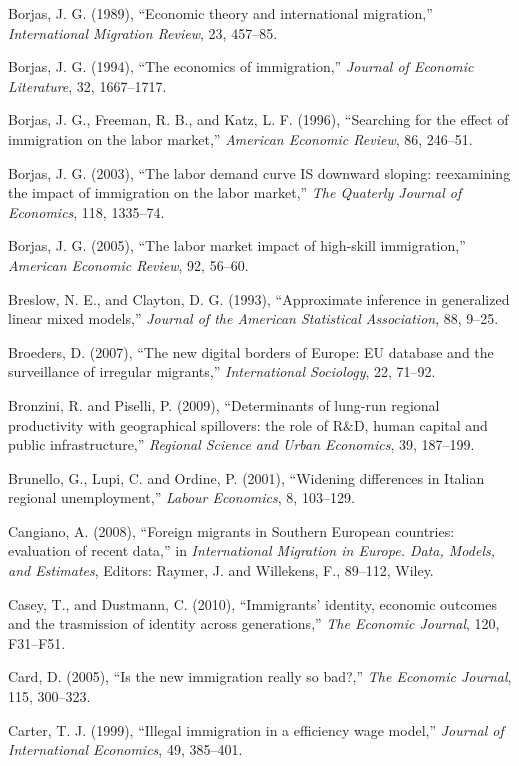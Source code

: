 \documentclass[10pt]{article}
\theoremstyle{definition}
\theoremstyle{plain}
\begin{document}
\begin{thebibliography}{99}
\bibitem{} Borjas, J. G. (1989), ``Economic theory and international migration,'' \textit{International Migration Review}, 23, 457--85.

\bibitem{} Borjas, J. G. (1994), ``The economics of immigration,'' \textit{Journal of Economic Literature}, 32, 1667--1717.

\bibitem{} Borjas, J. G., Freeman, R. B., and Katz, L. F. (1996), ``Searching for the effect of immigration on the labor market,'' \textit{American Economic Review}, 86, 246--51.

\bibitem{} Borjas, J. G. (2003), ``The labor demand curve IS downward sloping: reexamining the impact of immigration on the labor market,'' \textit{The Quaterly Journal of Economics}, 118, 1335--74.

\bibitem{} Borjas, J. G. (2005), ``The labor market impact of high-skill immigration,'' \textit{American Economic Review}, 92, 56--60.

\bibitem{} Breslow, N. E., and Clayton, D. G. (1993), ``Approximate inference in generalized linear mixed models,'' \textit{Journal of the American Statistical Association}, 88, 9--25.

\bibitem{} Broeders, D. (2007), ``The new digital borders of Europe: EU database and the surveillance of irregular migrants,'' \textit{International Sociology}, 22, 71--92.

\bibitem{} Bronzini, R. and Piselli, P. (2009), ``Determinants of lung-run regional productivity with geographical spillovers: the role of R$\&$D, human capital and public infrastructure,'' \textit{Regional Science and Urban Economics}, 39, 187--199.

\bibitem{} Brunello, G., Lupi, C. and Ordine, P. (2001), ``Widening differences in Italian regional unemployment,'' \textit{Labour Economics}, 8, 103--129.

\bibitem{} Cangiano, A. (2008), ``Foreign migrants in Southern European countries: evaluation of recent data,'' in \textit{International Migration in Europe. Data, Models, and Estimates}, Editors: Raymer, J. and Willekens, F., 89--112, Wiley.

\bibitem{} Casey, T., and Dustmann, C. (2010), ``Immigrants' identity, economic outcomes and the trasmission of identity across generations,'' \textit{The Economic Journal}, 120, F31--F51.

\bibitem{} Card, D. (2005), ``Is the new immigration really so bad?,'' \textit{The Economic Journal}, 115, 300--323.

\bibitem{} Carter, T. J. (1999), ``Illegal immigration in a efficiency wage model,'' \textit{Journal of International Economics}, 49, 385--401.


\end{thebibliography}
\end{document}
